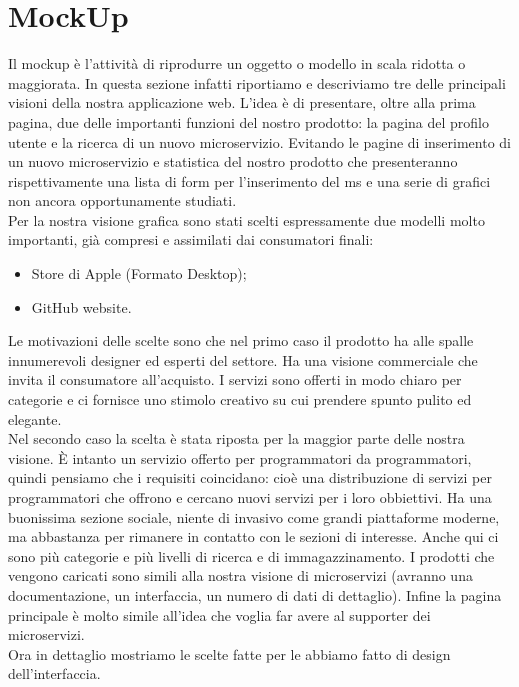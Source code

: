 \section{MockUp}{
	Il mockup è l'attività di riprodurre un oggetto o modello in scala ridotta o maggiorata. In questa sezione infatti riportiamo e descriviamo tre delle principali visioni della nostra applicazione web. L'idea è di presentare, oltre alla prima pagina, due delle importanti funzioni del nostro prodotto: la pagina del profilo utente e la ricerca di un nuovo microservizio. Evitando le pagine di inserimento di un nuovo microservizio e statistica del nostro prodotto che presenteranno rispettivamente una lista di form per l'inserimento del ms e una serie di grafici non ancora opportunamente studiati.\\
	Per la nostra visione grafica sono stati scelti espressamente due modelli molto importanti, già compresi e assimilati dai consumatori finali:
	\begin{itemize}
		\item Store di Apple (Formato Desktop);
		\item GitHub website.
	\end{itemize}
	Le motivazioni delle scelte sono che nel primo caso il prodotto ha alle spalle innumerevoli designer ed esperti del settore. Ha una visione commerciale che invita il consumatore all'acquisto. I servizi sono offerti in modo chiaro per categorie e ci fornisce uno stimolo creativo su cui prendere spunto pulito ed elegante.\\
	Nel secondo caso la scelta è stata riposta per la maggior parte delle nostra visione. È intanto un servizio offerto per programmatori da programmatori, quindi pensiamo che i requisiti coincidano: cioè una distribuzione di servizi per programmatori che offrono e cercano nuovi servizi per i loro obbiettivi. Ha una buonissima sezione sociale, niente di invasivo come grandi piattaforme moderne, ma abbastanza per rimanere in contatto con le sezioni di interesse. Anche qui ci sono più categorie e più livelli di ricerca e di immagazzinamento. I prodotti che vengono caricati sono simili alla nostra visione di microservizi (avranno una documentazione, un interfaccia, un numero di dati di dettaglio). Infine la pagina principale è molto simile all'idea che voglia far avere al supporter dei microservizi.\\ 
	Ora in dettaglio mostriamo le scelte fatte per le abbiamo fatto di design dell'interfaccia.
	
}
